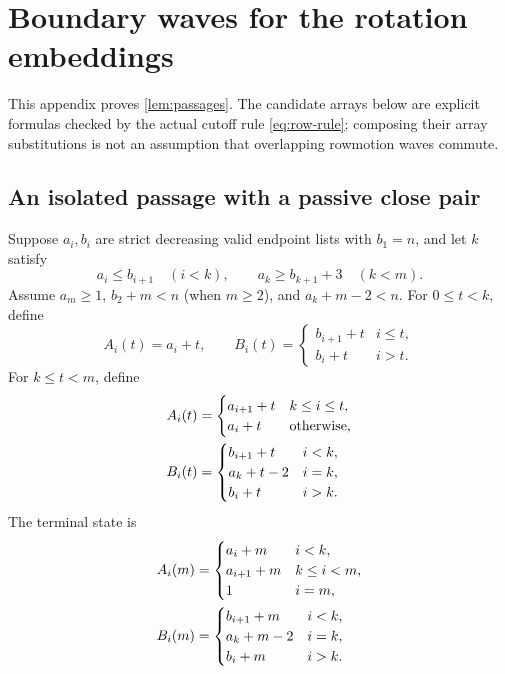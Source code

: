 \section{Boundary waves for the rotation embeddings}\label{app:local}
This appendix proves \cref{lem:passages}. The candidate arrays below are explicit formulas checked by the actual cutoff rule \eqref{eq:row-rule}; composing their array substitutions is not an assumption that overlapping rowmotion waves commute.

\subsection{An isolated passage with a passive close pair}\label{app:ordinary}
Suppose $a_i,b_i$ are strict decreasing valid endpoint lists with $b_1=n$, and let $k$ satisfy
\[
 a_i\le b_{i+1}\quad(i<k),\qquad
 a_k\ge b_{k+1}+3\quad(k<m).
\]
Assume $a_m\ge1$, $b_2+m<n$ (when $m\ge2$), and $a_k+m-2<n$. For $0\le t<k$, define
\begin{equation}\label{eq:ordinary-upper}
 A_i(t)=a_i+t,\qquad
 B_i(t)=\begin{cases}b_{i+1}+t&i\le t,\\b_i+t&i>t.\end{cases}
\end{equation}
For $k\le t<m$, define
\begin{align}
 A_i(t)&=\begin{cases}a_{i+1}+t&k\le i\le t,\\a_i+t&\text{otherwise},\end{cases}\label{eq:ordinary-lower}\\
 B_i(t)&=\begin{cases}b_{i+1}+t&i<k,\\a_k+t-2&i=k,\\b_i+t&i>k.\end{cases}\notag
\end{align}
The terminal state is
\begin{align}
 A_i(m)&=\begin{cases}a_i+m&i<k,\\a_{i+1}+m&k\le i<m,\\1&i=m,\end{cases}\label{eq:ordinary-terminal}\\
 B_i(m)&=\begin{cases}b_{i+1}+m&i<k,\\a_k+m-2&i=k,\\b_i+m&i>k.\end{cases}\notag
\end{align}

